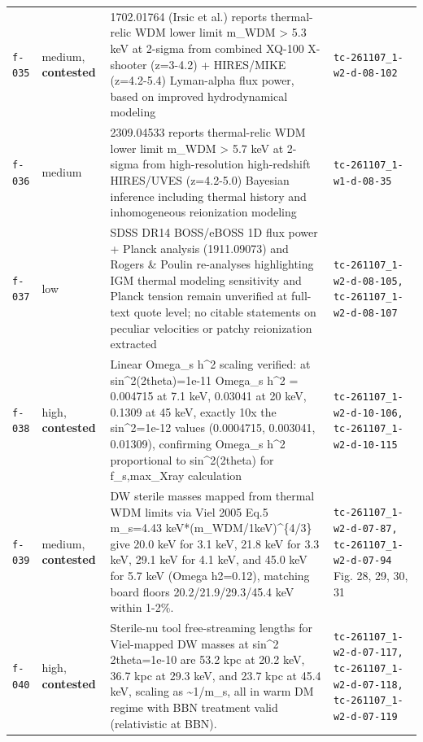 \documentclass[11pt,a4paper]{article}
\begin{document}
\begin{longtable}{@{}p{}p{}p{}p{}@{}}
\texttt{f-035} & medium, \textbf{contested} & 1702.01764 (Irsic et al.) reports thermal-relic WDM lower limit m\_WDM \textgreater{} 5.3 keV at 2-sigma from combined XQ-100 X-shooter (z=3-4.2) + HIRES/MIKE (z=4.2-5.4) Lyman-alpha flux power, based on improved hydrodynamical modeling & \texttt{tc-261107\_\allowbreak{}1-w2-d-08-102} \\
\texttt{f-036} & medium & 2309.04533 reports thermal-relic WDM lower limit m\_WDM \textgreater{} 5.7 keV at 2-sigma from high-resolution high-redshift HIRES/UVES (z=4.2-5.0) Bayesian inference including thermal history and inhomogeneous reionization modeling & \texttt{tc-261107\_\allowbreak{}1-w1-d-08-35} \\
\texttt{f-037} & low & SDSS DR14 BOSS/eBOSS 1D flux power + Planck analysis (1911.09073) and Rogers \& Poulin re-analyses highlighting IGM thermal modeling sensitivity and Planck tension remain unverified at full-text quote level; no citable statements on peculiar velocities or patchy reionization extracted & \texttt{tc-261107\_\allowbreak{}1-w2-d-08-105,\allowbreak{} tc-261107\_\allowbreak{}1-w2-d-08-107} \\
\texttt{f-038} & high, \textbf{contested} & Linear Omega\_s h\textasciicircum{}2 scaling verified: at sin\textasciicircum{}2(2theta)=1e-11 Omega\_s h\textasciicircum{}2 = 0.004715 at 7.1 keV, 0.03041 at 20 keV, 0.1309 at 45 keV, exactly 10x the sin\textasciicircum{}2=1e-12 values (0.0004715, 0.003041, 0.01309), confirming Omega\_s h\textasciicircum{}2 proportional to sin\textasciicircum{}2(2theta) for f\_s,max\_Xray calculation & \texttt{tc-261107\_\allowbreak{}1-w2-d-10-106,\allowbreak{} tc-261107\_\allowbreak{}1-w2-d-10-115} \\
\texttt{f-039} & medium, \textbf{contested} & DW sterile masses mapped from thermal WDM limits via Viel 2005 Eq.5 m\_s=4.43 keV*(m\_WDM/1keV)\textasciicircum{}\{4/3\} give 20.0 keV for 3.1 keV, 21.8 keV for 3.3 keV, 29.1 keV for 4.1 keV, and 45.0 keV for 5.7 keV (Omega h2=0.12), matching board floors 20.2/21.9/29.3/45.4 keV within 1-2\%. & \texttt{tc-261107\_\allowbreak{}1-w2-d-07-87,\allowbreak{} tc-261107\_\allowbreak{}1-w2-d-07-94} Fig. 28, 29, 30, 31 \\
\texttt{f-040} & high, \textbf{contested} & Sterile-nu tool free-streaming lengths for Viel-mapped DW masses at sin\textasciicircum{}2 2theta=1e-10 are 53.2 kpc at 20.2 keV, 36.7 kpc at 29.3 keV, and 23.7 kpc at 45.4 keV, scaling as \textasciitilde{}1/m\_s, all in warm DM regime with BBN treatment valid (relativistic at BBN). & \texttt{tc-261107\_\allowbreak{}1-w2-d-07-117,\allowbreak{} tc-261107\_\allowbreak{}1-w2-d-07-118,\allowbreak{} tc-261107\_\allowbreak{}1-w2-d-07-119} \\

\end{longtable}
\end{document}
